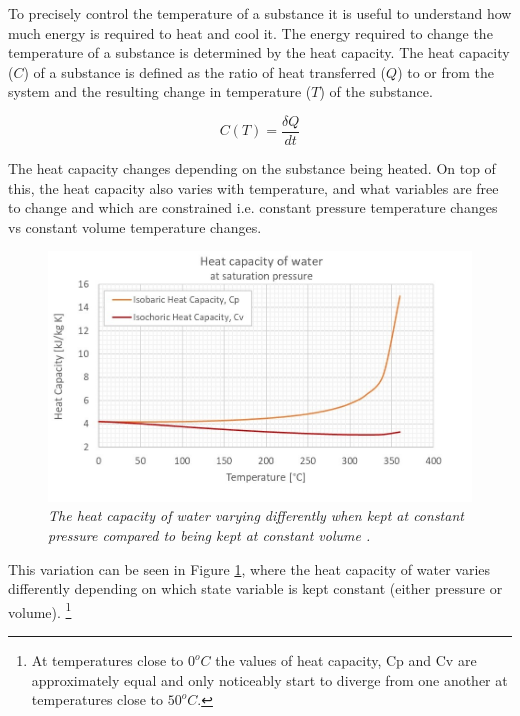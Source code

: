 \documentclass[10pt]{article}
\begin{document}
To precisely control the temperature of a substance it is useful to understand how much energy is required to heat and cool it. The energy required to change the temperature of a substance is determined by the heat capacity. The heat capacity ($C$) of a substance is defined as the ratio of heat transferred ($Q$) to or from the system and the resulting change in temperature ($T$) of the substance.  %

\begin{equation}\label{eq:heat_cap}
    C(T) = \frac{\delta Q}{dt}
\end{equation}

The heat capacity changes depending on the substance being heated. On top of this, the heat capacity also varies with temperature, and what variables are free to change and which are constrained i.e. constant pressure temperature changes vs constant volume temperature changes.\\

\begin{figure}[h!]
    \centering
    \includegraphics[scale=.75]{Heat_capacity_C.jpg}
    \caption{\it{The heat capacity of water varying differently when kept at constant pressure compared to being kept at constant volume \cite{heat_cap}.}}
    \label{fig:heat_cap_water}
\end{figure}

This variation can be seen in Figure \ref{fig:heat_cap_water}, where the heat capacity of water varies differently depending on which state variable is kept constant (either pressure or volume). \footnote{At temperatures close to $0^oC$ the values of heat capacity, Cp and Cv are approximately equal and only noticeably start to diverge from one another at temperatures close to $50^oC$.}\\
\end{document}
